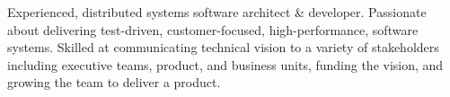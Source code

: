 \documentclass[10pt,a4paper,ragged2e,withhyper]{altacv}
\begin{document}


\makecvheader

Experienced, distributed systems software architect \& developer. Passionate about delivering test-driven, customer-focused, high-performance, software systems. Skilled at communicating technical vision to a variety of stakeholders including executive teams, product, and business units, funding the vision, and growing the team to deliver a product.


\end{document}
